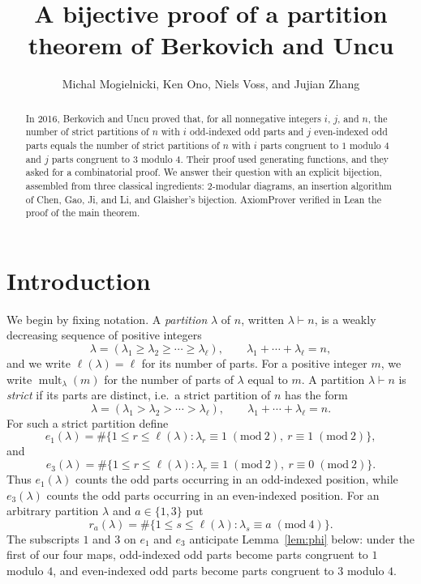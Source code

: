 \documentclass[11pt]{amsart}
\title[A bijective proof of a partition theorem of Berkovich and Uncu]{A bijective proof of a partition theorem of Berkovich and Uncu}
\author{Michal Mogielnicki, Ken Ono, Niels Voss, and Jujian Zhang}
\theoremstyle{definition}
\theoremstyle{remark}
\newcommand{\mult}{\operatorname{mult}}
\newcommand{\length}{\ell}
\newcommand{\modulo}[1]{\;(\mathrm{mod}\ #1)}
\begin{document}
\begin{abstract}
In 2016, Berkovich and Uncu proved that, for all nonnegative integers $i$, $j$, and $n$, the number of strict partitions of $n$ with $i$ odd-indexed odd parts and $j$ even-indexed odd parts equals the number of strict partitions of $n$ with $i$ parts congruent to $1$ modulo $4$ and $j$ parts congruent to $3$ modulo $4$. Their proof used generating functions, and they asked for a combinatorial proof. We answer their question with an explicit bijection, assembled from three classical ingredients: $2$-modular diagrams, an insertion algorithm of Chen, Gao, Ji, and Li, and Glaisher's bijection.
AxiomProver verified in Lean the proof of the main theorem.
\end{abstract}



\maketitle

\section{Introduction}\label{sec:intro}
We begin by fixing notation. A \emph{partition} $\lambda$ of $n$, written $\lambda\vdash n$, is a weakly decreasing sequence of positive integers
\[
  \lambda=(\lambda_1\ge\lambda_2\ge\cdots\ge\lambda_\ell),
  \qquad \lambda_1+\cdots+\lambda_\ell=n,
\]
and we write \(\length(\lambda)=\ell\) for its number of parts. For a positive integer $m$, we write $\mult_\lambda(m)$ for the number of parts of $\lambda$ equal to $m$.
A partition $\lambda \vdash n$ is \emph{strict} if its parts are distinct, i.e.\ a strict
partition of \(n\) has the form
\[
  \lambda=(\lambda_1>\lambda_2>\cdots>\lambda_\ell),
  \qquad \lambda_1+\cdots+\lambda_\ell=n.
\]
For such a strict partition define
\[
  e_1(\lambda)=\#\{1\le r\le \length(\lambda): \lambda_r\equiv 1\modulo 2,\ r\equiv 1\modulo 2\},
\]
and
\[
  e_3(\lambda)=\#\{1\le r\le \length(\lambda): \lambda_r\equiv 1\modulo 2,\ r\equiv 0\modulo 2\}.
\]
Thus \(e_1(\lambda)\) counts the odd parts occurring in an odd-indexed position,
while \(e_3(\lambda)\) counts the odd parts occurring in an even-indexed position.
For an arbitrary partition \(\lambda\) and \(a\in\{1,3\}\) put
\[
  r_a(\lambda)=\#\{1\le s\le \length(\lambda): \lambda_s\equiv a\modulo 4\}.
\]
The subscripts $1$ and $3$ on $e_1$ and $e_3$ anticipate Lemma~\ref{lem:phi} below: under the first of our four maps, odd-indexed odd parts become parts congruent to $1$ modulo $4$, and even-indexed odd parts become parts congruent to $3$ modulo $4$.
\end{document}
